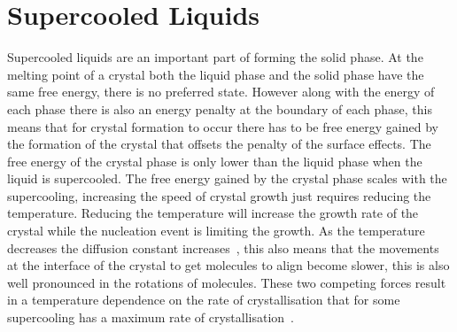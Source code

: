 \section{Supercooled Liquids}

Supercooled liquids are an important part of forming the solid phase. At the melting point of a crystal \si{\Tm} both the liquid phase and the solid phase have the same free energy, there is no preferred state. However along with the energy of each phase there is also an energy penalty at the boundary of each phase, this means that for crystal formation to occur there has to be free energy gained by the formation of the crystal that offsets the penalty of the surface effects. The free energy of the crystal phase is only lower than the liquid phase when the liquid is supercooled. The free energy gained by the crystal phase scales with the supercooling, increasing the speed of crystal growth just requires reducing the temperature. Reducing the temperature will increase the growth rate of the crystal while the nucleation event is limiting the growth. As the temperature decreases the diffusion constant increases~\secref{}, this also means that the movements at the interface of the crystal to get molecules to align become slower, this is also well pronounced in the rotations of molecules. These two competing forces result in a temperature dependence on the rate of crystallisation that for some supercooling has a maximum rate of crystallisation~.

\begin{figure}
    \caption{}
    \label{fig:crys rate}
\end{figure}

